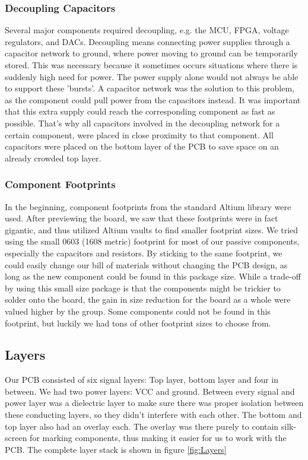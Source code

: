\subsubsection{Decoupling Capacitors}
Several major components required decoupling, e.g. the MCU, FPGA, voltage regulators, and DACs. Decoupling means connecting power supplies through a capacitor network to ground, where power moving to ground can be temporarily stored. This was necessary because it sometimes occurs situations where there is suddenly high need for power. The power supply alone would not always be able to support these 'bursts'. A capacitor network was the solution to this problem, as the component could pull power from the capacitors instead.
\newline
It was important that this extra supply could reach the corresponding component as fast as possible. That's why all capacitors involved in the decoupling network for a certain component, were placed in close proximity to that component. All capacitors were placed on the bottom layer of the PCB to save space on an already crowded top layer.

\subsubsection{Component Footprints}
In the beginning, component footprints from the standard Altium library were used. After previewing the board, we saw that these footprints were in fact gigantic, and thus utilized Altium vaults to find smaller footprint sizes. We tried using the small 0603 (1608 metric) footprint for most of our passive components, especially the capacitors and resistors. By sticking to the same footprint, we could easily change our bill of materials without changing the PCB design, as long as the new component could be found in this package size. While a trade-off by using this small size package is that the components might be trickier to solder onto the board, the gain in size reduction for the board as a whole were valued higher by the group. Some components could not be found in this footprint, but luckily we had tons of other footprint sizes to choose from.


\subsection{Layers}
Our PCB consisted of six signal layers: Top layer, bottom layer and four in between. We had two power layers: VCC and ground.
\newline
Between every signal and power layer was a dielectric layer to make sure there was proper isolation between these conducting layers, so they didn't interfere with each other.
\newline
The bottom and top layer also had an overlay each. The overlay was there purely to contain silk-screen for marking components, thus making it easier for us to work with the PCB.
\newline
The complete layer stack is shown in figure \ref{fig:Layers}

